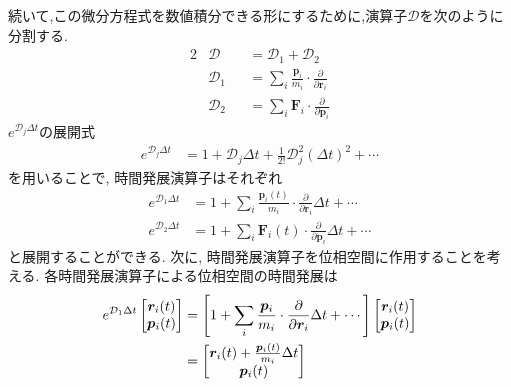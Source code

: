 続いて,この微分方程式を数値積分できる形にするために,演算子$\mathcal{D}$を次のように分割する. 
\begin{alignat}{2}
 &\mathcal{D}     &&= \mathcal{D}_{1} + \mathcal{D}_{2}
 \label{eq:1.30}
 \\
 &\mathcal{D}_{1} &&= \sum_{i} \frac{\bm{p}_{i}}{m_{i}} 
                      \cdot \frac{\partial}{\partial \bm{r}_{i}}
 \label{eq:1.31}
 \\
 &\mathcal{D}_{2} &&= \sum_{i} \bm{F}_{i}
                      \cdot \frac{\partial}{\partial \bm{p}_{i}}
 \label{eq:1.32}
\end{alignat}
$e^{\mathcal{D}_{j} \Delta t}$の展開式
\begin{align}
 e^{\mathcal{D}_{j} \Delta t}
 &=   1 + \mathcal{D}_{j} \Delta t
    + \frac{1}{2!} \mathcal{D}_{j}^{2} (\Delta t)^{2} + \cdots
\end{align}  
を用いることで, 時間発展演算子はそれぞれ
\begin{align}
 e^{\mathcal{D}_{1} \Delta t}
 &=   1 + \sum_{i} \frac{\bm{p}_{i} (t)}{m_{i}}
          \cdot \frac{\partial}{\partial \bm{r}_{i}} \Delta t
        + \cdots
 \label{eq:1.34}
 \\
 e^{\mathcal{D}_{2} \Delta t}
 &=   1 + \sum_{i} \bm{F}_{i} (t)
          \cdot \frac{\partial}{\partial \bm{p}_{i}} \Delta t
        + \cdots
\end{align}
と展開することができる.
次に, 時間発展演算子を位相空間に作用することを考える.
各時間発展演算子による位相空間の時間発展は
\begin{align}
 e^{\mathcal{D}_{1} \Delta t}
 \begin{bmatrix}
  \bm{r}_{i} (t) \\
  \bm{p}_{i} (t) \\
 \end{bmatrix}
 &= \left[
           1 + \sum_{i} \frac{\bm{p}_{i}}{m_{i}}
               \cdot \frac{\partial}{\partial \bm{r}_{i}} \Delta t + \cdots
    \right]
 \begin{bmatrix}
  \bm{r}_{i} (t) \\
  \bm{p}_{i} (t) \\
  \end{bmatrix}
 \notag
 \\
 &=
 \begin{bmatrix}
  \bm{r}_{i} (t) + \frac{\bm{p}_{i}(t)}{m_{i}} \Delta t \\
  \bm{p}_{i} (t)                                            \\
 \end{bmatrix}
 \label{eq:1.35}
\end{align}


